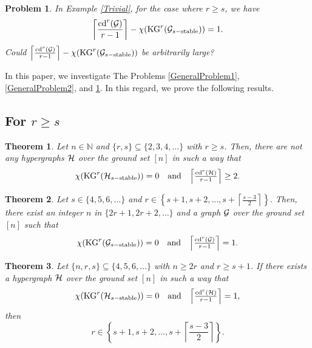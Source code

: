 \documentclass[11pt]{article}
\newtheorem{prethm}{{\bf Theorem}}
\newenvironment{thm}{\begin{prethm}{\hspace{-0.5
               em}{\bf.\ }}}{\end{prethm}}
\newtheorem{preprb}{{\bf Problem}}
\newenvironment{prb}{\begin{preprb}{\hspace{-0.5
               em}{\bf.\ }}}{\end{preprb}}
\begin{document}
\begin{prb} \label{GeneralProblem3}
	In Example \ref{Trivial}, for the case where $r \geq s$, we have
	$$\left\lceil  \frac{{\rm cd}^r ({\cal G})}{r-1}   \right\rceil      -  \chi ({\rm KG}^r ({\cal G}_{s-{\rm stable}}))  =1.$$
	Could
	$\left\lceil  \frac{{\rm cd}^r ({\cal G})}{r-1}   \right\rceil      -  \chi ({\rm KG}^r ({\cal G}_{s-{\rm stable}}))$ be arbitrarily large?
\end{prb}

In this paper, we investigate The Problems \ref{GeneralProblem1},
\ref{GeneralProblem2}, and \ref{GeneralProblem3}.
In this regard, we prove the following results.


\subsection{For $r \geq s$}




\begin{thm} \label{Forrgeqs1}
	Let $n \in \mathbb{N}$ and $\{r,s\} \subseteq \{2,3,4,\dots \}$ with
	$r\geq s$.
	Then, there are not any hypergraphs ${\cal H}$ over the ground set $[n]$
	in such a way that
	$$\begin{array}{ccc}
		\chi ({\rm KG}^r ({\cal H}_{s-{\rm stable}}))=0    &   {\rm and}    &    \left\lceil  \frac{{\rm cd}^r ({\cal H})}{r-1}   \right\rceil  \geq 2.        \\
	\end{array}$$
\end{thm}


\begin{thm} \label{directrs}
	Let $s \in \{4,5,6, \dots \}$ and 
	$r \in \left\{s+1, s+2, \dots , s+ \left\lceil  \frac{s-3}{2}   \right\rceil \right\}.$
	Then, there exist an integer $n$ in $\{2r+1, 2r+2 , \dots \}$ and a graph ${\cal G}$ over the ground set $[n]$ such that
	$$\begin{array}{ccc}
		\chi ({\rm KG}^r ({\cal G}_{s-{\rm stable}})) = 0  &  {\rm and}    &    
		\left\lceil  \frac{{\rm cd}^r ({\cal G})}{r-1}   \right\rceil =1 .  \\
	\end{array}$$
\end{thm}


\begin{thm} \label{inversers}
	Let $\{n,r,s\} \subseteq \{4,5,6,\dots \}$ with
	$n\geq 2r$ and $r\geq s+1$.
	If there exists a hypergraph ${\cal H}$ over the ground set $[n]$
	in such a way that
	$$\begin{array}{ccc}
		\chi ({\rm KG}^r ({\cal H}_{s-{\rm stable}}))=0    &   {\rm and}    &    \left\lceil  \frac{{\rm cd}^r ({\cal H})}{r-1}   \right\rceil  = 1,        \\
	\end{array}$$
	then
	$$r \in \left\{s+1, s+2, \dots , s+ \left\lceil  \frac{s-3}{2}   \right\rceil \right\}.$$
\end{thm}
\end{document}
